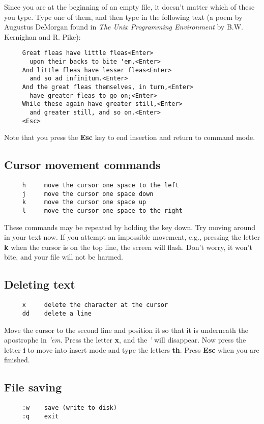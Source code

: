 Since you are at the beginning of an empty file, it doesn't matter 
which of these you type. Type one of them, and then type in the 
following text (a poem by Augustus DeMorgan found in {\em The Unix Programming 
Environment} by B.W. Kernighan and R. Pike):

\begin{verbatim}
     Great fleas have little fleas<Enter>
       upon their backs to bite 'em,<Enter>
     And little fleas have lesser fleas<Enter>
       and so ad infinitum.<Enter>
     And the great fleas themselves, in turn,<Enter>
       have greater fleas to go on;<Enter>
     While these again have greater still,<Enter>
       and greater still, and so on.<Enter>
     <Esc>
\end{verbatim}

Note that you press the {\bf Esc} key to end insertion and return 
to command mode.

\subsection{Cursor movement commands}

\begin{verbatim}
     h     move the cursor one space to the left
     j     move the cursor one space down
     k     move the cursor one space up
     l     move the cursor one space to the right
\end{verbatim}

These commands may be repeated by holding the key down. Try moving 
around in your text now. If you attempt an impossible movement, 
e.g., pressing the letter {\bf k} when the cursor is on the top line, 
the screen will flash. Don't worry, it won't bite, and your file 
will not be harmed.

\subsection{Deleting text}
\begin{verbatim}
     x     delete the character at the cursor
     dd    delete a line
\end{verbatim}

Move the cursor to the second line and position it so that it 
is underneath the apostrophe in {\em 'em}. Press the letter {\bf x}, and 
the {\em '} will disappear. Now press the letter {\bf i} to move into 
insert mode and type the letters {\bf th}. Press {\bf Esc} when you 
are finished.

\subsection{File saving}
\begin{verbatim}
     :w    save (write to disk)
     :q    exit 
\end{verbatim}

